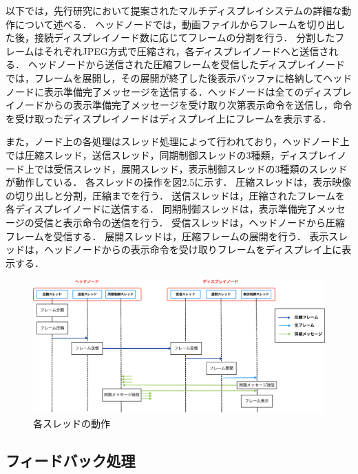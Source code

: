 以下では，先行研究において提案されたマルチディスプレイシステムの詳細な動作について述べる．
ヘッドノードでは，動画ファイルからフレームを切り出した後，接続ディスプレイノード数に応じてフレームの分割を行う．
分割したフレームはそれぞれJPEG方式で圧縮され，各ディスプレイノードへと送信される．
ヘッドノードから送信された圧縮フレームを受信したディスプレイノードでは，フレームを展開し，その展開が終了した後表示バッファに格納してヘッドノードに表示準備完了メッセージを送信する．ヘッドノードは全てのディスプレイノードからの表示準備完了メッセージを受け取り次第表示命令を送信し，命令を受け取ったディスプレイノードはディスプレイ上にフレームを表示する．

また，ノード上の各処理はスレッド処理によって行われており，ヘッドノード上では圧縮スレッド，送信スレッド，同期制御スレッドの3種類，ディスプレイノード上では受信スレッド，展開スレッド，表示制御スレッドの3種類のスレッドが動作している．
各スレッドの操作を図2.5に示す．
圧縮スレッドは，表示映像の切り出しと分割，圧縮までを行う．
送信スレッドは，圧縮されたフレームを各ディスプレイノードに送信する．
同期制御スレッドは，表示準備完了メッセージの受信と表示命令の送信を行う．
受信スレッドは，ヘッドノードから圧縮フレームを受信する．
展開スレッドは，圧縮フレームの展開を行う．
表示スレッドは，ヘッドノードからの表示命令を受け取りフレームをディスプレイ上に表示する．

\begin{center}
  \begin{figure}[H]
      \hspace*{\fill}
      \includegraphics[width=1.1\linewidth]{./fig/frow_system.eps}
      \hspace*{\fill}
      \caption{各スレッドの動作}
  \end{figure}
  \end{center}
   

\subsection*{フィードバック処理}


